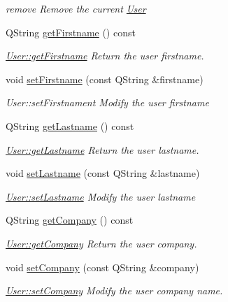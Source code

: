 \begin{DoxyCompactItemize}
\begin{DoxyCompactList}\small\item\em remove Remove the current \hyperlink{classUser}{User} \end{DoxyCompactList}\item 
Q\-String \hyperlink{classUser_acad034d3a093164f056d06d9a3ee33a2}{get\-Firstname} () const 
\begin{DoxyCompactList}\small\item\em \hyperlink{classUser_acad034d3a093164f056d06d9a3ee33a2}{User\-::get\-Firstname} Return the user firstname. \end{DoxyCompactList}\item 
void \hyperlink{classUser_ad9f69006800232eb19146d2354910412}{set\-Firstname} (const Q\-String \&firstname)
\begin{DoxyCompactList}\small\item\em User\-::set\-Firstnament Modify the user {\itshape firstname} \end{DoxyCompactList}\item 
Q\-String \hyperlink{classUser_aabbb05d0c6e6be5ed078ba3c730b24b3}{get\-Lastname} () const 
\begin{DoxyCompactList}\small\item\em \hyperlink{classUser_aabbb05d0c6e6be5ed078ba3c730b24b3}{User\-::get\-Lastname} Return the user lastname. \end{DoxyCompactList}\item 
void \hyperlink{classUser_a90d5bae75aa56253642386ad42da171d}{set\-Lastname} (const Q\-String \&lastname)
\begin{DoxyCompactList}\small\item\em \hyperlink{classUser_a90d5bae75aa56253642386ad42da171d}{User\-::set\-Lastname} Modify the user {\itshape lastname} \end{DoxyCompactList}\item 
Q\-String \hyperlink{classUser_ace35ae55a1681e5df796ebee79fa5b07}{get\-Company} () const 
\begin{DoxyCompactList}\small\item\em \hyperlink{classUser_ace35ae55a1681e5df796ebee79fa5b07}{User\-::get\-Company} Return the user company. \end{DoxyCompactList}\item 
void \hyperlink{classUser_a3a92e61c3e31dddeff27bc8c2307f2db}{set\-Company} (const Q\-String \&company)
\begin{DoxyCompactList}\small\item\em \hyperlink{classUser_a3a92e61c3e31dddeff27bc8c2307f2db}{User\-::set\-Company} Modify the user {\itshape company} name. \end{DoxyCompactList}\item 

\end{DoxyCompactItemize}
